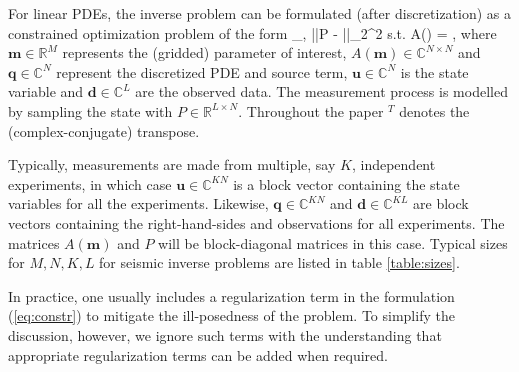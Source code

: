 \documentclass{iopart}
\begin{document}
For linear PDEs, the inverse problem can be formulated (after discretization) as a constrained optimization problem of the form
\bq
\label{eq:constr}
\min_{,} ||P - ||_2^2  \quad 
\mbox{s.t.} \quad A() = ,
\eq
where $\mathbf{m}\in\mathbb{R}^{M}$ represents the (gridded) parameter of interest, $A(\mathbf{m})\in\mathbb{C}^{N\times N}$ and $\mathbf{q}\in\mathbb{C}^{N}$ represent the discretized PDE and source term, $\mathbf{u}\in\mathbb{C}^{N}$ is the state variable and $\mathbf{d}\in \mathbb{C}^{L}$ are the observed data. The measurement process is modelled by sampling the state with $P\in \mathbb{R}^{L\times N}$. Throughout the paper $^T$ denotes the (complex-conjugate) transpose.  

Typically, measurements are made from multiple, say $K$, independent experiments,
in which case $\mathbf{u} \in \mathbb{C}^{KN}$ is a block vector containing the state variables for all the experiments. Likewise, $\mathbf{q}\in \mathbb{C}^{KN}$ and $\mathbf{d}\in \mathbb{C}^{KL}$ are block vectors containing the right-hand-sides and observations for all experiments. The matrices $A(\mathbf{m})$ and $P$ will be block-diagonal matrices in this case. Typical sizes for $M,N,K,L$ for seismic inverse problems are listed in table \ref{table:sizes}.

In practice, one usually includes a regularization term in the formulation (\ref{eq:constr}) to mitigate the ill-posedness of the problem. To simplify the discussion, however, we ignore such terms with the understanding that appropriate regularization terms can be added when required.
\end{document}
